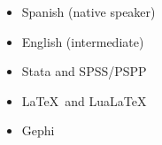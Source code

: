 




\twocolumnsection
{
\begin{itemize}
\vspace{1em}
	\item Spanish (native speaker)
	\item English (intermediate)
\end{itemize}}
{
\vspace{1em}
\begin{itemize}
	\item Stata and SPSS/PSPP
	\item \LaTeX\ and Lua\LaTeX\
    \item Gephi
\end{itemize}
}
\\